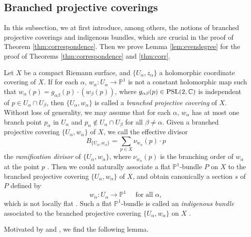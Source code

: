 \documentclass[12pt]{article}
\begin{document}
\subsection{Branched projective coverings}
\label{subsec:branch}

In this subsection, we at first introduce, among others, the notions of branched projective coverings and indigenous bundles, which are crucial in the proof of Theorem \ref{thm:correspondence}. Then we prove Lemma \ref{lem:evendegree} for the proof of Theorems \ref{thm:correspondence} and \ref{thm:corr}.

Let $X$ be a compact Riemann surface, and $\{U_{\alpha}, z_{\alpha}\}$ a holomorphic coordinate covering of $X$. If for each $\alpha$, $w_{\alpha}\colon U_{\alpha} \rightarrow \mathbb{P}^1$ is not a constant holomorphic map such that $w_{\alpha}(p) = g_{\alpha \beta}(p) \cdot (w_{\beta}(p))$, where $g_{\alpha\beta}(p) \in {\rm PSL}(2, \mathbb{C})$ is independent of $p \in U_{\alpha} \cap U_{\beta}$, then $\{U_{\alpha}, w_{\alpha}\}$ is called a {\it branched projective covering} of $X$. Without loss of generality, we may assume that for each $\alpha$, $w_{\alpha}$ has at most one branch point $p_{\alpha}$ in $U_{\alpha}$ and $p_{\alpha} \not\in U_{\alpha} \cap U_{\beta}$ for all $\beta \neq \alpha$. Given a branched projective covering $\{U_{\alpha}, w_{\alpha}\}$ of $X$, we call the effective divisor
\[ B_{\{U_{\alpha},w_{\alpha}\}} = \sum_{p \in X} \nu_{w_{\alpha}}(p)\cdot p\]
the {\it ramification divisor} of  $\{U_{\alpha}, w_{\alpha}\}$, where $\nu_{w_{\alpha}}(p)$ is the branching order of $w_{\alpha}$ at the point $p$ \cite[Section 2]{Mand72}. Then we could naturally associate a flat $\mathbb{P}^1$-bundle $P$ on $X$ \cite[Section 2]{Gunning67} to the branched projective covering  $\{U_{\alpha},w_{\alpha}\}$ of $X$, and obtain canonically a section $s$ of $P$ defined by
\[ w_\alpha \colon U_\alpha\to {\mathbb P}^1\quad \text{ for all }\alpha, \]
which is not locally flat \cite[Section 2]{Gunning67}. Such a flat $\mathbb{P}^1$-bundle is called an {\it indigenous bundle} associated to the branched projective covering $\{U_{\alpha}, w_{\alpha}\}$ on $X$ \cite{Gunning67, Mand73}.

Motivated by \cite[Theorem 2]{Gunning67} and \cite[Theorem 2]{Mand73}, we find the following lemma.
\end{document}
